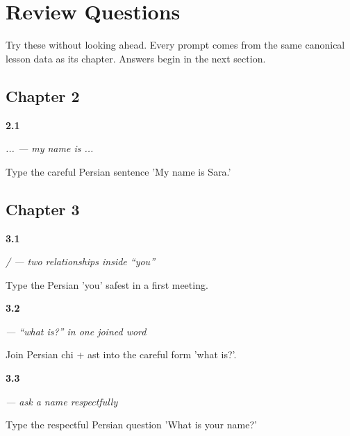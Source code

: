 
\chapter*{Review Questions}

Try these without looking ahead. Every prompt comes from the same canonical lesson data as its chapter. Answers begin in the next section.

\section*{Chapter 2}

\noindent\begin{minipage}[t]{\linewidth}
\raggedright
\hypertarget{review-FA-C02-esm-e-man-sara}{\textbf{2.1}} \emph{  ...  — my name is ...}\par
\small Type the careful Persian sentence 'My name is Sara.'
\end{minipage}\par\medskip

\section*{Chapter 3}

\noindent\begin{minipage}[t]{\linewidth}
\raggedright
\hypertarget{review-FA-C03-shoma-to-first-meeting}{\textbf{3.1}} \emph{ /  — two relationships inside “you”}\par
\small Type the Persian 'you' safest in a first meeting.
\end{minipage}\par\medskip

\noindent\begin{minipage}[t]{\linewidth}
\raggedright
\hypertarget{review-FA-C03-chist-fusion}{\textbf{3.2}} \emph{ — “what is?” in one joined word}\par
\small Join Persian chi + ast into the careful form 'what is?'.
\end{minipage}\par\medskip

\noindent\begin{minipage}[t]{\linewidth}
\raggedright
\hypertarget{review-FA-C03-esm-e-shoma-chist-question}{\textbf{3.3}} \emph{   — ask a name respectfully}\par
\small Type the respectful Persian question 'What is your name?'
\end{minipage}\par\medskip


